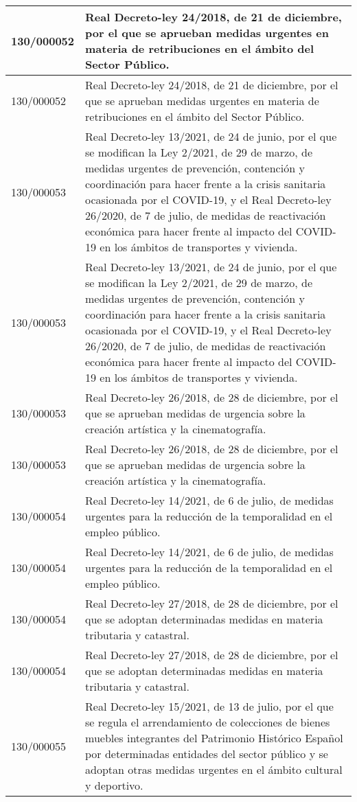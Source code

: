 {\begin{table}[H]
\begin{center}
\begin{tabularx}{\linewidth}{| l | X |}
\hline
130/000052 & Real Decreto-ley 24/2018, de 21 de diciembre, por el que se aprueban medidas urgentes en materia de retribuciones en el ámbito del Sector Público. \\
\hline
130/000052 & Real Decreto-ley 24/2018, de 21 de diciembre, por el que se aprueban medidas urgentes en materia de retribuciones en el ámbito del Sector Público. \\
\hline
130/000053 & Real Decreto-ley 13/2021, de 24 de junio, por el que se modifican la Ley 2/2021, de 29 de marzo, de medidas urgentes de prevención, contención y coordinación para hacer frente a la crisis sanitaria ocasionada por el COVID-19, y el Real Decreto-ley 26/2020, de 7 de julio, de medidas de reactivación económica para hacer frente al impacto del COVID-19 en los ámbitos de transportes y vivienda. \\
\hline
130/000053 & Real Decreto-ley 13/2021, de 24 de junio, por el que se modifican la Ley 2/2021, de 29 de marzo, de medidas urgentes de prevención, contención y coordinación para hacer frente a la crisis sanitaria ocasionada por el COVID-19, y el Real Decreto-ley 26/2020, de 7 de julio, de medidas de reactivación económica para hacer frente al impacto del COVID-19 en los ámbitos de transportes y vivienda. \\
\hline
130/000053 & Real Decreto-ley 26/2018, de 28 de diciembre, por el que se aprueban medidas de urgencia sobre la creación artística y la cinematografía. \\
\hline
130/000053 & Real Decreto-ley 26/2018, de 28 de diciembre, por el que se aprueban medidas de urgencia sobre la creación artística y la cinematografía. \\
\hline
130/000054 & Real Decreto-ley 14/2021, de 6 de julio, de medidas urgentes para la reducción de la temporalidad en el empleo público. \\
\hline
130/000054 & Real Decreto-ley 14/2021, de 6 de julio, de medidas urgentes para la reducción de la temporalidad en el empleo público. \\
\hline
130/000054 & Real Decreto-ley 27/2018, de 28 de diciembre, por el que se adoptan determinadas medidas en materia tributaria y catastral. \\
\hline
130/000054 & Real Decreto-ley 27/2018, de 28 de diciembre, por el que se adoptan determinadas medidas en materia tributaria y catastral. \\
\hline
130/000055 & Real Decreto-ley 15/2021, de 13 de julio, por el que se regula el arrendamiento de colecciones de bienes muebles integrantes del Patrimonio Histórico Español por determinadas entidades del sector público y se adoptan otras medidas urgentes en el ámbito cultural y deportivo. \\

\end{tabularx}
\end{center}
\end{table}}
